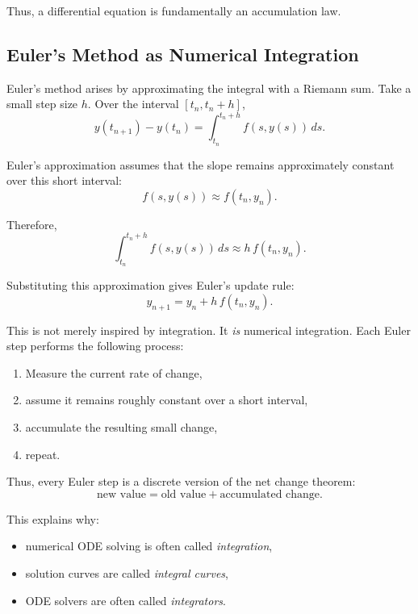 Thus, a differential equation is fundamentally an accumulation law.

\subsection*{Euler's Method as Numerical Integration}

Euler's method arises by approximating the integral with a Riemann sum.
Take a small step size \(h\). Over the interval \([t_n,t_n+h]\),
\[
  y(t_{n+1})-y(t_n)
  =
  \int_{t_n}^{t_n+h} f(s,y(s))\,ds.
\]

Euler's approximation assumes that the slope remains approximately constant over this short interval:
\[
  f(s,y(s))
  \approx
  f(t_n,y_n).
\]

Therefore,
\[
  \int_{t_n}^{t_n+h} f(s,y(s))\,ds
  \approx
  h\,f(t_n,y_n).
\]

Substituting this approximation gives Euler's update rule:
\[
  y_{n+1}=y_n+h\,f(t_n,y_n).
\]

This is not merely inspired by integration. It \emph{is} numerical integration.
Each Euler step performs the following process:

\begin{enumerate}
  \item Measure the current rate of change,
  \item assume it remains roughly constant over a short interval,
  \item accumulate the resulting small change,
  \item repeat.
\end{enumerate}

Thus, every Euler step is a discrete version of the net change theorem:
\[
  \text{new value}
  =
  \text{old value}
  +
  \text{accumulated change}.
\]

This explains why:

\begin{itemize}
  \item numerical ODE solving is often called \emph{integration},
  \item solution curves are called \emph{integral curves},
  \item ODE solvers are often called \emph{integrators}.
\end{itemize}

